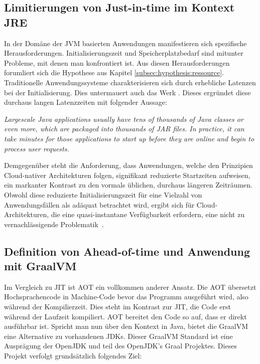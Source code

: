 \subsection{Limitierungen von Just-in-time im Kontext JRE}

In der Domäne der \ac{JVM} basierten Anwendungen manifestieren sich spezifische Herausforderungen. Initialisierungszeit und Speicherplatzbedarf sind mitunter Probleme, mit denen man konfrontiert ist. Aus diesen Herausforderungen forumliert sich die Hypothese aus Kapitel \ref{subsec:hypothesis:ressource}. Traditionelle Anwendungssysteme charakterisieren sich durch erhebliche Latenzen bei der Initialisierung. Dies untermauert auch das Werk \textit{}. Dieses ergründet diese durchaus langen Latenzzeiten mit folgender Aussage:

\begin{spar}
    \textit{Largescale Java applications usually have tens of thousands of Java classes or even more, which are packaged into thousands of JAR files. In practice, it can take minutes for those applications to start up before they are online and begin to process user requests.~\parencite[][]{9678709}{}{}}
\end{spar}

Demgegenüber steht die Anforderung, dass Anwendungen, welche den Prinzipien \newline Cloud-nativer Architekturen folgen, signifikant reduzierte Startzeiten aufweisen, ein markanter Kontrast zu den vormals üblichen, durchaus längeren Zeiträumen. Obwohl diese reduzierte Initialisierungszeit für eine Vielzahl von Anwendungsfällen als adäquat betrachtet wird, ergibt sich für Cloud-Architekturen, die eine quasi-instantane Verfügbarkeit erfordern, eine nicht zu vernachlässigende Problematik~\parencite[vgl.][]{12Factor}. 

 
 \subsection{Definition von Ahead-of-time und Anwendung mit GraalVM}
 Im Vergleich zu \ac{JIT} ist \ac{AOT} ein vollkommen anderer Ansatz. Die \acl{AOT} übersetzt Hochsprachencode in Machine-Code bevor das Programm ausgeführt wird, also während der Kompilierzeit. Dies steht im Kontrast zur \acl{JIT}, die Code erst während der Laufzeit kompiliert. AOT bereitet den Code so auf, dass er direkt ausführbar ist. 
 Spricht man nun über den Kontext in Java, bietet die GraalVM \parencite[vgl.][]{graalvm2023} eine Alternative zu vorhandenen JDKs. Dieser GraalVM Standard ist eine Ausprägung der OpenJDK und teil des OpenJDK's Graal Projektes. Dieses Projekt verfolgt grundsätzlich folgendes Ziel:

